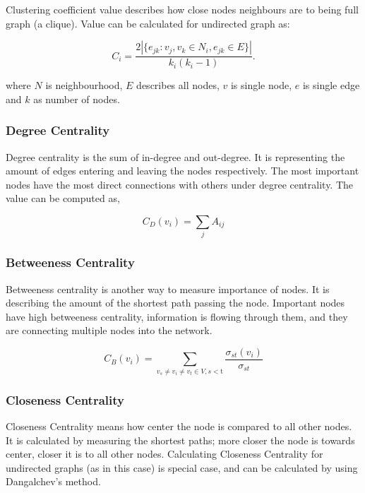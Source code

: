 Clustering coefficient value describes how close nodes neighbours are to being full graph (a clique).
Value can be calculated for undirected graph as:

\begin{equation}
    \label{eq:clustering-coefficient}
    C_i = \frac{2|\{e_{jk}: v_j,v_k \in N_i, e_{jk} \in E\}|}{k_i(k_i-1)}.
\end{equation}

where $N$ is neighbourhood, $E$ describes all nodes, $v$ is single node, $e$ is single edge and $k$ as number of nodes.

\subsubsection{Degree Centrality}

Degree centrality is the sum of in-degree and out-degree.
It is representing the amount of edges entering and leaving the nodes respectively.
The most important nodes have the most direct connections with others under degree centrality.
The value can be computed as,

\begin{equation}
    \label{eq:degree-centrality}
    C_{D}(v_{i})={\sum}_{j}A_{ij}
\end{equation}

\subsubsection{Betweeness Centrality}

Betweeness centrality is another way to measure importance of nodes.
It is describing the amount of the shortest path passing the node.
Important nodes have high betweeness centrality, information is flowing through them, and they are connecting multiple nodes into the network.

\begin{equation}
    C_{B}(v_{i})={\sum}_{v_{s}\neq v_{i}\neq v_{t}\in V,s < \text{t}}\frac{\sigma_{st}(v_{i})}{\sigma_{st}}
\end{equation}

\subsubsection{Closeness Centrality}

Closeness Centrality means how center the node is compared to all other nodes.
It is calculated by measuring the shortest paths; more closer the node is towards center, closer it is to all other nodes.
Calculating Closeness Centrality for undirected graphs (as in this case) is special case,
and can be calculated by using Dangalchev's method\cite{DANGALCHEV2006556}.

